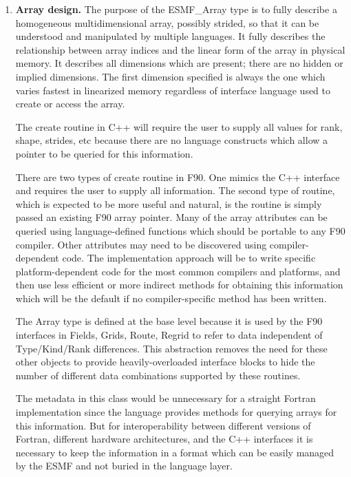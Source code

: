 

\begin{enumerate}

\item{\bf Array design.}
The purpose of the ESMF\_Array type is to fully describe a homogeneous
multidimensional array, possibly strided, so that it can be understood
and manipulated by multiple languages.   It fully describes the
relationship between array indices and the linear form of the array
in physical memory.  It describes all dimensions which are present;
there are no hidden or implied dimensions.  The first dimension specified
is always the one which varies fastest in linearized memory regardless of
interface language used to create or access the array.

The create routine in C++ will require the user to supply all values for
rank, shape, strides, etc because there are no language constructs which
allow a pointer to be queried for this information.

There are two types of create routine in F90.  One mimics the C++
interface and requires the user to supply all information.  
The second
type of routine, which is expected to be more useful and natural, is
the routine is simply passed an existing F90 array pointer.   Many of the
array attributes can be queried using language-defined functions which
should be portable to any F90 compiler.   Other attributes may need to
be discovered using compiler-dependent code.  The implementation approach
will be to write specific platform-dependent code for the most common
compilers and platforms, and then use less efficient or more indirect 
methods for obtaining this information which will be the default if 
no compiler-specific method has been written.

The Array type is defined at the base level because it is used by the
F90 interfaces in Fields, Grids, Route, Regrid to refer to data 
independent of Type/Kind/Rank differences.  This abstraction removes
the need for these other objects to provide
heavily-overloaded interface blocks to hide the number of
different data combinations supported by these routines.

The metadata in this class would be unnecessary for a straight
Fortran implementation since the language provides methods for querying
arrays for this information.  But for interoperability between different
versions of Fortran, different hardware architectures, 
and the C++ interfaces
it is necessary to keep the information in a format which can be
easily managed by the ESMF and not buried in the language layer.


\end{enumerate}
